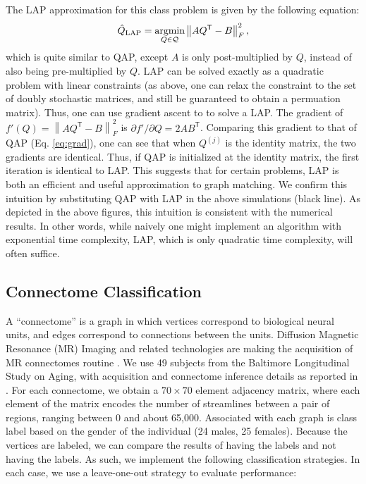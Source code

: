 \documentclass{article} %
\providecommand{\norm}[1]{\left \lVert#1 \right  \rVert}
\newcommand{\argmin}{\operatornamewithlimits{argmin}}
\newcommand{\T}{^{\ensuremath{\mathsf{T}}}}           %
\providecommand{\mc}[1]{\mathcal{#1}}
\providecommand{\mh}[1]{\hat{#1}}
\begin{document}
The LAP approximation for this class problem is given by the following equation:
\begin{align} \label{eq:LAP}
	\mh{Q}_{\text{LAP}} = \argmin_{Q \in \mc{Q}} \norm{A Q\T - B }^2_F,
\end{align}
which is quite similar to QAP, except $A$ is only post-multiplied by $Q$, instead of also being pre-multiplied by $Q$. LAP can be solved exactly as a quadratic problem with linear constraints (as above, one can relax the constraint to the set of doubly stochastic matrices, and still be guaranteed to obtain a permuation matrix). Thus, one can use gradient ascent to to solve a LAP.  The gradient of $f'(Q)=\norm{AQ\T-B}_F^2$ is %
	$\partial f'/\partial Q = 2A B\T$. 
Comparing this gradient to that of QAP (Eq. \eqref{eq:grad}), one can see that when $Q^{(j)}$ is the identity matrix, the two gradients are identical.  Thus, if QAP is initialized at the identity matrix, the first iteration is identical to LAP.  This suggests that for certain problems, LAP is both an efficient and useful approximation to graph matching.  We confirm this intuition by substituting QAP with LAP in the above simulations (black line).  As depicted in the above figures, this intuition is consistent with the numerical results. In other words, while naively one might implement an algorithm with exponential time complexity, LAP, which is only quadratic time complexity, will often suffice.



\subsection{Connectome Classification} %
\label{sub:connectome_classification}

A ``connectome'' is a graph in which vertices correspond to biological neural units, and edges correspond to connections between the units.  Diffusion Magnetic Resonance (MR) Imaging and related technologies are making the acquisition of MR connectomes routine \cite{Hagmann2010}.  We use 49 subjects from the Baltimore Longitudinal Study on Aging, with acquisition and connectome inference details as reported in \cite{OHBM10}.  For each connectome, we obtain a $70 \times 70$ element adjacency matrix, where each element of the matrix encodes the number of streamlines between a pair of regions, ranging between 0 and about 65,000.  Associated with each graph is class label based on the gender of the individual (24 males, 25 females).  Because the vertices are labeled, we can compare the results of having the labels and not having the labels.  As such, we implement the following classification strategies.  In each case, we use a leave-one-out strategy to evaluate performance:
\end{document}
